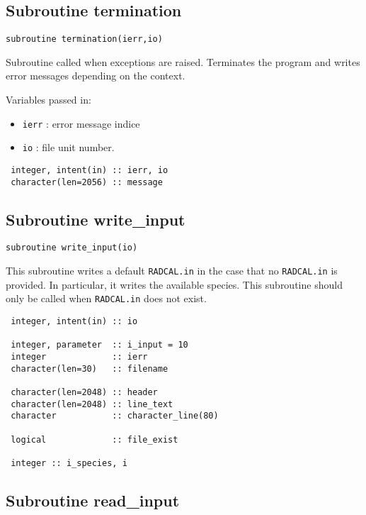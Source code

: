 \subsection{Subroutine termination}
\label{sub:termination}
\begin{lstlisting}
subroutine termination(ierr,io)
\end{lstlisting}
 Subroutine called when exceptions are raised. Terminates the program and writes error messages depending on the context.

 Variables passed in:
 \begin{itemize}
  \item  \verb=ierr= : error message indice
  \item  \verb=io=   : file unit number.
 \end{itemize}

\begin{lstlisting}
 integer, intent(in) :: ierr, io
 character(len=2056) :: message
\end{lstlisting}


\subsection{Subroutine write\_input}
\label{sub:write_input}

\begin{lstlisting}
subroutine write_input(io)
\end{lstlisting}
 This subroutine writes a default \verb=RADCAL.in= in the case that no \verb=RADCAL.in= is provided.
 In particular, it writes the available species. This subroutine should only be called when \verb=RADCAL.in= does not exist.
\begin{lstlisting}
 integer, intent(in) :: io

 integer, parameter  :: i_input = 10
 integer             :: ierr
 character(len=30)   :: filename

 character(len=2048) :: header
 character(len=2048) :: line_text
 character           :: character_line(80)

 logical             :: file_exist

 integer :: i_species, i

\end{lstlisting}

\subsection{Subroutine read\_input}
\label{sub:read_input}

